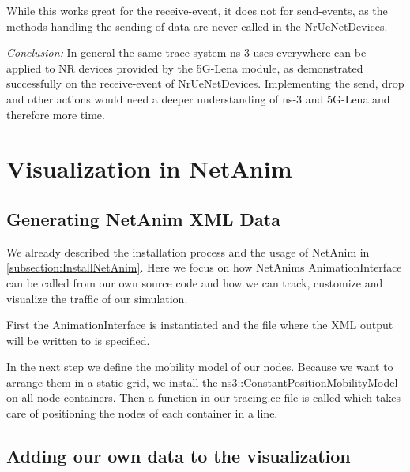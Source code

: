 While this works great for the receive-event, it does not for send-events, as the methods handling the sending of data are never called in the NrUeNetDevices.

\textit{Conclusion:} In general the same trace system ns-3 uses everywhere can be applied to NR devices provided by the 5G-Lena module, as demonstrated successfully on the receive-event of NrUeNetDevices. Implementing the send, drop and other actions would need a deeper understanding of ns-3 and 5G-Lena and therefore more time.

\section{Visualization in NetAnim}
\subsection{Generating NetAnim XML Data}
We already described the installation process and the usage of NetAnim in \ref{subsection:InstallNetAnim}. Here we focus on how NetAnims AnimationInterface can be called from our own source code and how we can track, customize and visualize the traffic of our simulation.

First the AnimationInterface is instantiated and the file where the XML output will be written to is specified.

In the next step we define the mobility model of our nodes. Because we want to arrange them in a static grid, we install the ns3::ConstantPositionMobilityModel on all node containers. Then a function in our tracing.cc file is called which takes care of positioning the nodes of each container in a line.
\subsection{Adding our own data to the visualization}







